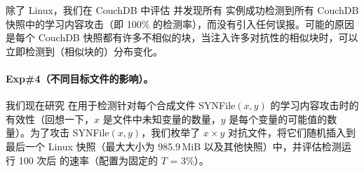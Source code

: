 除了 Linux，我们在 CouchDB 中评估 \sysnameF 并发现所有 \sysnameF 实例成功检测到所有 CouchDB 快照中的学习内容攻击（即 100\% 的检测率），而没有引入任何误报。可能的原因是每个 CouchDB 快照都有许多不相似的块，当注入许多对抗性的相似块时，\sysnameF 可以立即检测到（相似块的）分布变化。


\paragraph{Exp\#4（不同目标文件的影响）。}
我们现在研究 \sysnameF 在用于检测针对每个合成文件 SYNFile$(x, y)$ 的学习内容攻击时的有效性（回想一下，$x$ 是文件中未知变量的数量，$y $ 是每个变量的可能值的数量）。为了攻击 SYNFile$(x, y)$，我们枚举了 $x\times y$ 对抗文件，将它们随机插入到最后一个 Linux 快照（最大大小为 985.9\,MiB 以及其他快照）中，并评估检测运行 100 次后 \sysnameF 的速率（配置为固定的 $T$ = 3\%）。



